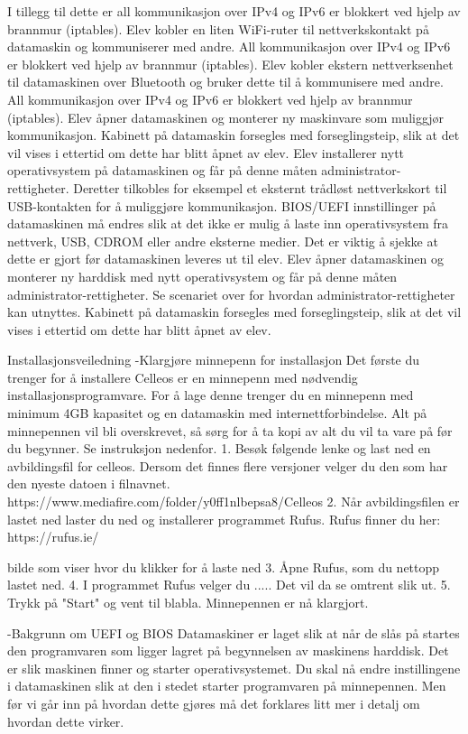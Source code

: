 I tillegg til dette er all kommunikasjon over IPv4 og IPv6 er blokkert ved hjelp av brannmur (iptables).
Elev kobler en liten WiFi-ruter til nettverkskontakt på datamaskin og kommuniserer med andre.	All kommunikasjon over IPv4 og IPv6 er blokkert ved hjelp av brannmur (iptables).
Elev kobler ekstern nettverksenhet til datamaskinen over Bluetooth og bruker dette til å kommunisere med andre.	All kommunikasjon over IPv4 og IPv6 er blokkert ved hjelp av brannmur (iptables).
Elev åpner datamaskinen og monterer ny maskinvare som muliggjør kommunikasjon.	Kabinett på datamaskin forsegles med forseglingsteip, slik at det vil vises i ettertid om dette har blitt åpnet av elev.
Elev installerer nytt operativsystem på datamaskinen og får på denne måten administrator-rettigheter. Deretter tilkobles for eksempel et eksternt trådløst nettverkskort til USB-kontakten for å muliggjøre kommunikasjon.	BIOS/UEFI innstillinger på datamaskinen må endres slik at det ikke er mulig å laste inn operativsystem fra nettverk, USB, CDROM eller andre eksterne medier. Det er viktig å sjekke at dette er gjort før datamaskinen leveres ut til elev.
Elev åpner datamaskinen og monterer ny harddisk med nytt operativsystem og får på denne måten administrator-rettigheter. Se scenariet over for hvordan administrator-rettigheter kan utnyttes.	Kabinett på datamaskin forsegles med forseglingsteip, slik at det vil vises i ettertid om dette har blitt åpnet av elev.



Installasjonsveiledning
-Klargjøre minnepenn for installasjon
Det første du trenger for å installere Celleos er en minnepenn med nødvendig installasjonsprogramvare. For å lage denne trenger du en minnepenn med minimum 4GB kapasitet og en datamaskin med internettforbindelse. Alt på minnepennen vil bli overskrevet, så sørg for å ta kopi av alt du vil ta vare på før du begynner. Se instruksjon nedenfor.
1. Besøk følgende lenke og last ned en avbildingsfil for celleos. Dersom det finnes flere versjoner velger du den som har den nyeste datoen i filnavnet.
https://www.mediafire.com/folder/y0ff1nlbepsa8/Celleos
2. Når avbildingsfilen er lastet ned laster du ned og installerer programmet Rufus. Rufus finner du her:
https://rufus.ie/
\centerline{
\epsfxsize 6cm
}
bilde som viser hvor du klikker for å laste ned
3. Åpne Rufus, som du nettopp lastet ned.
4. I programmet Rufus velger du .....
Det vil da se omtrent slik ut.
5. Trykk på "Start" og vent til blabla. Minnepennen er nå klargjort.

-Bakgrunn om UEFI og BIOS
Datamaskiner er laget slik at når de slås på startes den programvaren som ligger lagret på begynnelsen av maskinens harddisk. Det er slik maskinen finner og starter operativsystemet. Du skal nå endre instillingene i datamaskinen slik at den i stedet starter programvaren på minnepennen. Men før vi går inn på hvordan dette gjøres må det forklares litt mer i detalj om hvordan dette virker.

